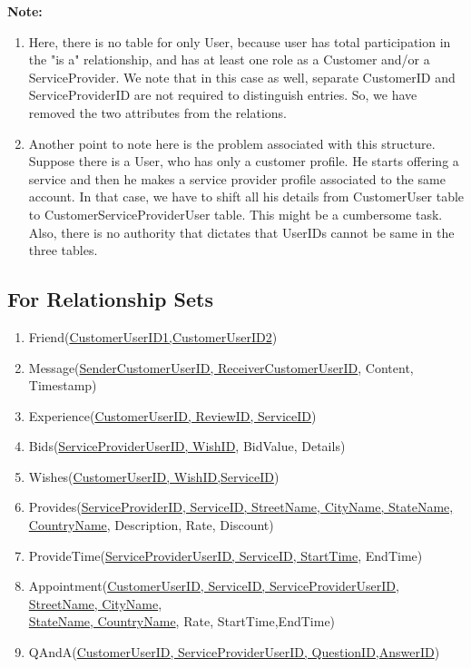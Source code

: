 \documentclass[a4paper]{article}
\begin{document}
\newpage
\textbf{Note:} 
\begin{enumerate}

\item Here, there is no table for only User, because user has total participation in the "is a" relationship, and has at least one role as a Customer and/or a ServiceProvider. We note that in this case as well, separate CustomerID and ServiceProviderID are not required to distinguish entries. So, we have removed the two attributes from the relations.
\item Another point to note here is the problem associated with this structure. Suppose there is a User, who has only a customer profile. He starts offering a service and then he makes a service provider profile associated to the same account. In that case, we have to shift all his details from CustomerUser table to CustomerServiceProviderUser table. This might be a cumbersome task. Also, there is no authority that dictates that UserIDs cannot be same in the three tables.

\end{enumerate}


\subsection{For Relationship Sets}

\begin{enumerate}
\item Friend(\underline{CustomerUserID1,CustomerUserID2})
\item Message(\underline{SenderCustomerUserID, ReceiverCustomerUserID}, Content, Timestamp)
\item Experience(\underline{CustomerUserID, ReviewID, ServiceID})
\item Bids(\underline{ServiceProviderUserID, WishID}, BidValue, Details)
\item Wishes(\underline{CustomerUserID, WishID,ServiceID})
\item Provides(\underline{ServiceProviderID, ServiceID, StreetName, CityName, StateName, CountryName}, Description, Rate, Discount)
\item ProvideTime(\underline{ServiceProviderUserID, ServiceID, StartTime}, EndTime)
\item Appointment(\underline{CustomerUserID, ServiceID, ServiceProviderUserID, StreetName, CityName},\\ \underline{ StateName, CountryName}, Rate, StartTime,EndTime)  
\item QAndA(\underline{CustomerUserID, ServiceProviderUserID, QuestionID,AnswerID})

\end{enumerate}
\end{document}
